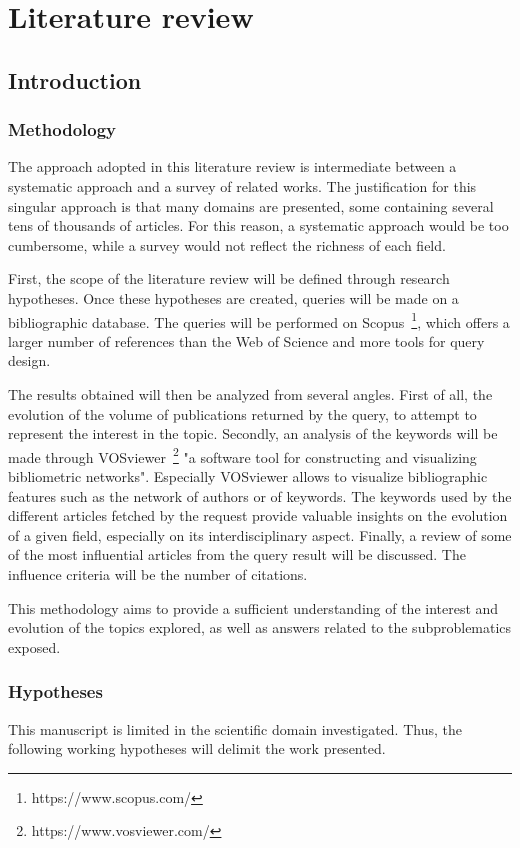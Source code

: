 \chapter{Literature review}

\section*{Introduction}
\subsection*{Methodology}
The approach adopted in this literature review is intermediate between a systematic approach and a survey of related works.
The justification for this singular approach is that many domains are presented, some containing several tens of thousands of articles.
For this reason, a systematic approach would be too cumbersome, while a survey would not reflect the richness of each field.

First, the scope of the literature review will be defined through research hypotheses.
Once these hypotheses are created, queries will be made on a bibliographic database.
The queries will be performed on Scopus~\footnote{https://www.scopus.com/}, which offers a larger number of references than the Web of Science and more tools for query design.

The results obtained will then be analyzed from several angles. First of all, the evolution of the volume of publications returned by the query, to attempt to represent the interest in the topic.
Secondly, an analysis of the keywords will be made through VOSviewer~\footnote{https://www.vosviewer.com/} "a software tool for constructing and visualizing bibliometric networks".
Especially VOSviewer allows to visualize bibliographic features such as the network of authors or of keywords.
The keywords used by the different articles fetched by the request provide valuable insights on the evolution of a given field, especially on its interdisciplinary aspect.
Finally, a review of some of the most influential articles from the query result will be discussed.
The influence criteria will be the number of citations.

This methodology aims to provide a sufficient understanding of the interest and evolution of the topics explored, as well as answers related to the subproblematics exposed.

\subsection*{Hypotheses}
This manuscript is limited in the scientific domain investigated.
Thus, the following working hypotheses will delimit the work presented.

